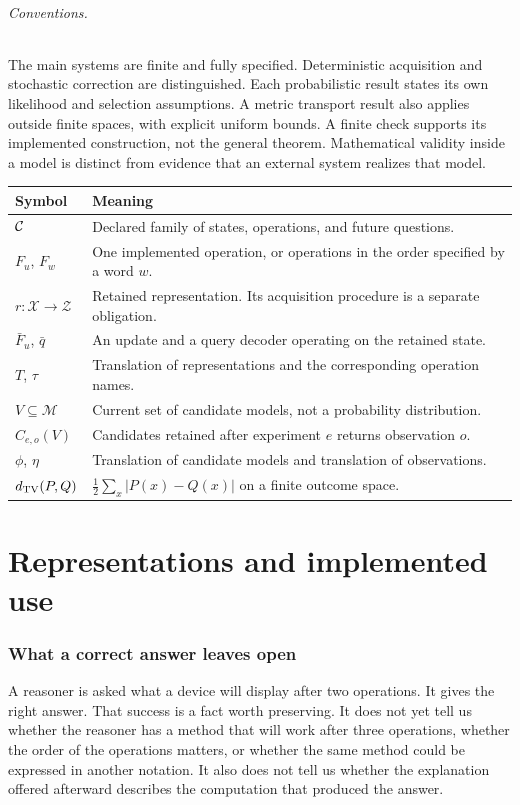 \documentclass[11pt,letterpaper]{article}
\theoremstyle{plain}
\theoremstyle{definition}
\newcommand{\X}{\mathcal X}\newcommand{\Z}{\mathcal Z}
\newcommand{\M}{\mathcal M}\newcommand{\E}{\mathbb E}
\begin{document}
\paragraph{Conventions.}
The main systems are finite and fully specified. Deterministic acquisition and stochastic correction are distinguished. Each probabilistic result states its own likelihood and selection assumptions. A metric transport result also applies outside finite spaces, with explicit uniform bounds. A finite check supports its implemented construction, not the general theorem. Mathematical validity inside a model is distinct from evidence that an external system realizes that model.

\begin{center}\small
\begin{tabularx}{\textwidth}{@{}lX@{}}\toprule
Symbol & Meaning\\\midrule
$\mathcal C$ & Declared family of states, operations, and future questions.\\
$F_u$, $F_w$ & One implemented operation, or operations in the order specified by a word $w$.\\
$r:\X\to\Z$ & Retained representation. Its acquisition procedure is a separate obligation.\\
$\bar F_u$, $\bar q$ & An update and a query decoder operating on the retained state.\\
$T$, $\tau$ & Translation of representations and the corresponding operation names.\\
$V\subseteq\M$ & Current set of candidate models, not a probability distribution.\\
$C_{e,o}(V)$ & Candidates retained after experiment $e$ returns observation $o$.\\
$\phi$, $\eta$ & Translation of candidate models and translation of observations.\\
$d_{\mathrm{TV}}(P,Q)$ & $\tfrac12\sum_x|P(x)-Q(x)|$ on a finite outcome space.\\\bottomrule
\end{tabularx}\end{center}
\clearpage{}

\part{Representations and implemented use}

\section{What a correct answer leaves open}\label{sec:intro}
A reasoner is asked what a device will display after two operations. It gives the right answer. That success is a fact worth preserving. It does not yet tell us whether the reasoner has a method that will work after three operations, whether the order of the operations matters, or whether the same method could be expressed in another notation. It also does not tell us whether the explanation offered afterward describes the computation that produced the answer.
\end{document}
